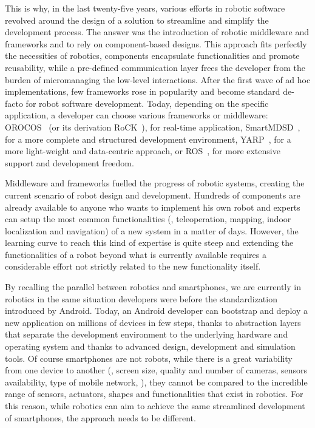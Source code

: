 This is why, in the last twenty-five years, various efforts in robotic software revolved around the design of a solution to streamline and simplify the development process. The answer was the introduction of robotic middleware and frameworks and to rely on component-based designs. This approach fits perfectly the necessities of robotics, components encapsulate functionalities and promote reusability, while a pre-defined communication layer frees the developer from the burden of micromanaging the low-level interactions. After the first wave of ad hoc implementations, few frameworks rose in popularity and become standard de-facto for robot software development. Today, depending on the specific application, a developer can choose various frameworks or middleware: OROCOS~\cite{bruyninckx2002orocos} (or its derivation RoCK~\cite{joyeux2011robot}), for real-time application, SmartMDSD~\cite{dennis2016smartmdsd}, for a more complete and structured development environment, YARP~\cite{metta2006yarp}, for a more light-weight and data-centric approach, or ROS~\cite{quigley2009ros}, for more extensive support and development freedom.

Middleware and frameworks fuelled the progress of robotic systems, creating the current scenario of robot design and development. Hundreds of components are already available to anyone who wants to implement his own robot and experts can setup the most common functionalities (\ie, teleoperation, mapping, indoor localization and navigation) of a new system in a matter of days. However, the learning curve to reach this kind of expertise is quite steep and extending the functionalities of a robot beyond what is currently available requires a considerable effort not strictly related to the new functionality itself.

By recalling the parallel between robotics and smartphones, we are currently in robotics in the same situation developers were before the standardization introduced by Android. Today, an Android developer can bootstrap and deploy a new application on millions of devices in few steps, thanks to abstraction layers that separate the development environment to the underlying hardware and operating system and thanks to advanced design, development and simulation tools. Of course smartphones are not robots, while there is a great variability from one device to another (\eg, screen size, quality and number of cameras, sensors availability, type of mobile network, \etc), they cannot be compared to the incredible range of sensors, actuators, shapes and functionalities that exist in robotics. For this reason, while robotics can aim to achieve the same streamlined development of smartphones, the approach needs to be different.

